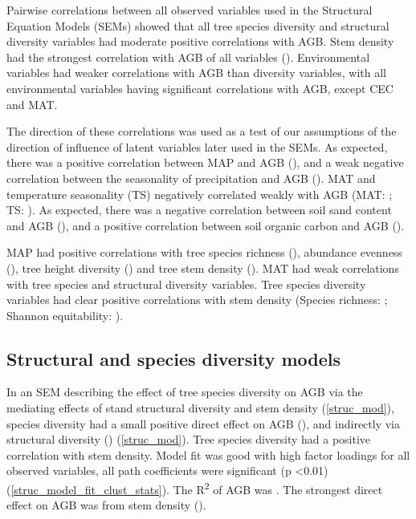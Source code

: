 \documentclass[11pt,a4paper]{article}
\begin{document}
Pairwise correlations between all observed variables used in the Structural Equation Models (SEMs) showed that all tree species diversity and structural diversity variables had moderate positive correlations with AGB. Stem density had the strongest correlation with AGB of all variables (\ccib{}). Environmental variables had weaker correlations with AGB than diversity variables, with all environmental variables having significant correlations with AGB, except CEC and MAT.

The direction of these correlations was used as a test of our assumptions of the direction of influence of latent variables later used in the SEMs. As expected, there was a positive correlation between MAP and AGB (\ccmb{}), and a weak negative correlation between the seasonality of precipitation and AGB (\ccmcb{}). MAT and temperature seasonality (TS) negatively correlated weakly with AGB (MAT: \cctb{}; TS: \cctcb{}). As expected, there was a negative correlation between soil sand content and AGB (\ccsb{}), and a positive correlation between soil organic carbon and AGB (\ccob{}). 

MAP had positive correlations with tree species richness (\ccms{}), abundance evenness (\ccme{}), tree height diversity (\ccmh{}) and tree stem density (\ccmi{}). MAT had weak correlations with tree species and structural diversity variables. Tree species diversity variables had clear positive correlations with stem density (Species richness: \ccsi{}; Shannon equitability: \ccei{}). 

\subsection{Structural and species diversity models}

In an SEM describing the effect of tree species diversity on AGB via the mediating effects of stand structural diversity and stem density (\autoref{struc_mod}), species diversity had a small positive direct effect on AGB (\strucdb{}), and indirectly via structural diversity (\strucdsb{}) (\autoref{struc_mod}). Tree species diversity had a positive correlation with stem density. Model fit was good with high factor loadings for all observed variables, all path coefficients were significant (p <0.01) (\autoref{struc_model_fit_clust_stats}). The R\textsuperscript{2} of AGB was \strucrsq{}. The strongest direct effect on AGB was from stem density (\strucsib{}).
\end{document}
